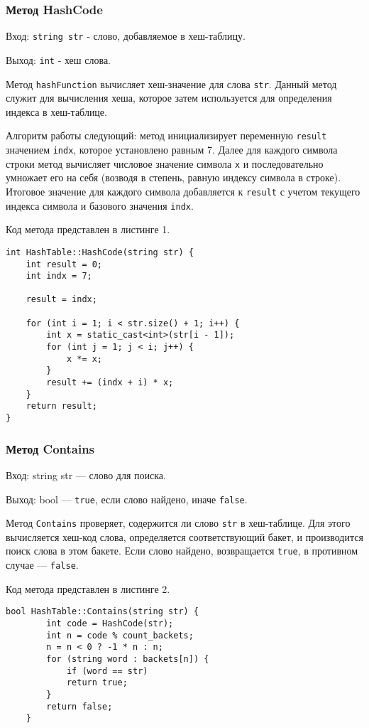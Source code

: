 \documentclass[10pt,a4paper,final]{article} %
\begin{document}
\subsubsection{Метод HashCode}
Вход: \texttt{string str} - слово, добавляемое в хеш-таблицу. 

Выход: \texttt{int} - хеш слова. \\

\par Метод \texttt{hashFunction} вычисляет хеш-значение для слова \texttt{str}. Данный метод служит для вычисления хеша, которое затем используется для определения индекса в хеш-таблице.

\par Алгоритм работы следующий: метод инициализирует переменную \texttt{result} значением \texttt{indx}, которое установлено равным 7. Далее для каждого символа строки метод вычисляет числовое значение символа \texttt{x} и последовательно умножает его на себя (возводя в степень, равную индексу символа в строке). Итоговое значение для каждого символа добавляется к \texttt{result} с учетом текущего индекса символа и базового значения \texttt{indx}.

Код метода представлен в листинге 1. \begin{lstlisting}[label=hashCodeExample, caption = Метод HashCode] 
int HashTable::HashCode(string str) {	
	int result = 0;
	int indx = 7;
	
	result = indx;
	
	for (int i = 1; i < str.size() + 1; i++) {
		int x = static_cast<int>(str[i - 1]);
		for (int j = 1; j < i; j++) {
			x *= x;
		}
		result += (indx + i) * x;
	}
	return result;
} \end{lstlisting}


\subsubsection{Метод Contains}
Вход: string str — слово для поиска.

Выход: bool — \texttt{true}, если слово найдено, иначе \texttt{false}. 

\par Метод \texttt{Contains} проверяет, содержится ли слово \texttt{str} в хеш-таблице. Для этого вычисляется хеш-код слова, определяется соответствующий бакет, и производится поиск слова в этом бакете. Если слово найдено, возвращается \texttt{true}, в противном случае — \texttt{false}.

Код метода представлен в листинге 2. \begin{lstlisting}[label=containsMethod, caption = Метод Contains] 
	bool HashTable::Contains(string str) {
		int code = HashCode(str);
		int n = code % count_backets;
		n = n < 0 ? -1 * n : n;
		for (string word : backets[n]) {
			if (word == str)
			return true;
		}
		return false;
	} \end{lstlisting}
\end{document}
